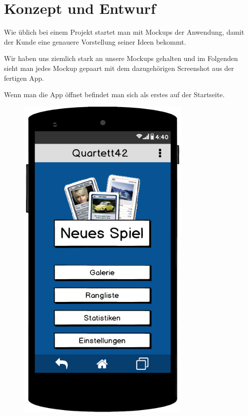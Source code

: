 \chapter{Konzept und Entwurf}

Wie üblich bei einem Projekt startet man mit Mockups der Anwendung, damit der Kunde eine genauere Vorstellung seiner Ideen bekommt. 

Wir haben uns ziemlich stark an unsere Mockups gehalten und im Folgenden sieht man jedes Mockup gepaart mit dem dazugehörigen Screenshot aus der fertigen App.

Wenn man die App öffnet befindet man sich als erstes auf der Startseite.\\

\begin{figure}[h]
    \centering
    \begin{minipage}{0.45\textwidth}
        \centering
        \includegraphics[width=0.75\textwidth]{img/mockups/main_screen.png}

\end{minipage}
\end{figure}
